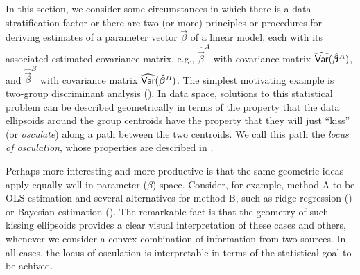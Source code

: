 %

In this section, we consider some circumstances in which there is a data stratification factor or there are two (or more)
principles or procedures for deriving estimates of a parameter vector $\vec{\beta}$
of a linear model,
each with its associated estimated covariance matrix, e.g.,
$\widehat{\vec{\beta}}^A$ with covariance matrix $\widehat{\mathsf{Var}}(\hat{\bm{\beta}}^A)$,
and
$\widehat{\vec{\beta}}^B$ with covariance matrix $\widehat{\mathsf{Var}}(\hat{\bm{\beta}}^B)$.
The simplest motivating example is two-group discriminant analysis ().
In data space, solutions to this statistical problem can be described geometrically
in terms of the property that the data ellipsoids around the group centroids 
have the property that they will just ``kiss''
(or \emph{osculate}) along a path between the two centroids. We call this path
the \emph{locus of osculation}, whose properties are described in .

Perhaps more interesting and more productive is that the same geometric ideas
apply equally well in parameter ($\beta$) space. Consider, for example,
method A to be OLS estimation and several alternatives
for method B, such as ridge regression () or Bayesian estimation
(). The remarkable fact is that the geometry of such kissing
ellipsoids provides a clear visual interpretation of these cases and others,
whenever we consider a convex combination of information from two sources. In all cases,
the locus of osculation is interpretable in
terms of the statistical goal to be achived.


